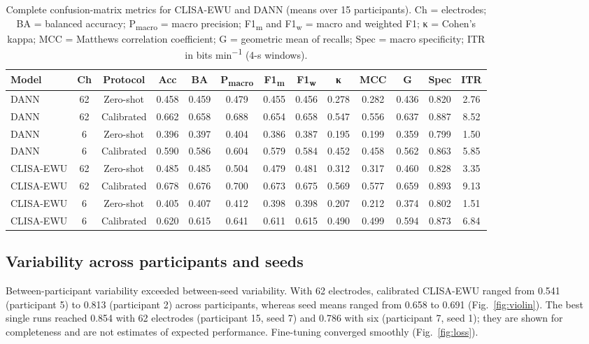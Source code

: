 \begin{table}[!htbp]
  \centering
  {\scriptsize\setlength{\tabcolsep}{2.6pt}
  \begin{tabular}{@{}lcccccccccccc@{}}
  \toprule
\textbf{Model} & \textbf{Ch} & \textbf{Protocol} & \textbf{Acc} & \textbf{BA} & \textbf{P\textsubscript{macro}} & \textbf{F1\textsubscript{m}} & \textbf{F1\textsubscript{w}} & \textbf{κ} & \textbf{MCC} & \textbf{G} & \textbf{Spec} & \textbf{ITR} \\
\midrule
DANN & 62 & Zero-shot & 0.458 & 0.459 & 0.479 & 0.455 & 0.456 & 0.278 & 0.282 & 0.436 & 0.820 & 2.76 \\
DANN & 62 & Calibrated & 0.662 & 0.658 & 0.688 & 0.654 & 0.658 & 0.547 & 0.556 & 0.637 & 0.887 & 8.52 \\
DANN & 6 & Zero-shot & 0.396 & 0.397 & 0.404 & 0.386 & 0.387 & 0.195 & 0.199 & 0.359 & 0.799 & 1.50 \\
DANN & 6 & Calibrated & 0.590 & 0.586 & 0.604 & 0.579 & 0.584 & 0.452 & 0.458 & 0.562 & 0.863 & 5.85 \\
CLISA-EWU & 62 & Zero-shot & 0.485 & 0.485 & 0.504 & 0.479 & 0.481 & 0.312 & 0.317 & 0.460 & 0.828 & 3.35 \\
CLISA-EWU & 62 & Calibrated & 0.678 & 0.676 & 0.700 & 0.673 & 0.675 & 0.569 & 0.577 & 0.659 & 0.893 & 9.13 \\
CLISA-EWU & 6 & Zero-shot & 0.405 & 0.407 & 0.412 & 0.398 & 0.398 & 0.207 & 0.212 & 0.374 & 0.802 & 1.51 \\
CLISA-EWU & 6 & Calibrated & 0.620 & 0.615 & 0.641 & 0.611 & 0.615 & 0.490 & 0.499 & 0.594 & 0.873 & 6.84 \\
  \bottomrule
  \end{tabular}}
  \caption{Complete confusion-matrix metrics for CLISA-EWU and DANN (means over 15 participants). Ch = electrodes; BA = balanced accuracy; P\textsubscript{macro} = macro precision; F1\textsubscript{m} and F1\textsubscript{w} = macro and weighted F1; κ = Cohen’s kappa; MCC = Matthews correlation coefficient; G = geometric mean of recalls; Spec = macro specificity; ITR in bits min\textsuperscript{−1} (4-s windows).}
  \label{tab:cmext}
\end{table}


\subsection{Variability across participants and seeds}
Between-participant variability exceeded between-seed variability. With 62 electrodes, calibrated CLISA-EWU ranged from 0.541 (participant 5) to 0.813 (participant 2) across participants, whereas seed means ranged from 0.658 to 0.691 (Fig.~\ref{fig:violin}). The best single runs reached 0.854 with 62 electrodes (participant 15, seed 7) and 0.786 with six (participant 7, seed 1); they are shown for completeness and are not estimates of expected performance. Fine-tuning converged smoothly (Fig.~\ref{fig:loss}).

